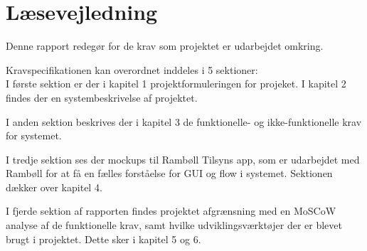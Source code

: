 \chapter*{Læsevejledning}
Denne rapport redegør for de krav som projektet er udarbejdet omkring. 

Kravspecifikationen kan overordnet inddeles i 5 sektioner:\\
I første sektion er der i kapitel 1 projektformuleringen for projeket. I kapitel 2 findes der en systembeskrivelse af projektet.

I anden sektion beskrives der i kapitel 3 de funktionelle- og ikke-funktionelle krav for systemet.

I tredje sektion ses der mockups til Rambøll Tilsyns app, som er udarbejdet med Rambøll for at få en fælles forståelse for GUI og flow i systemet. 
Sektionen dækker over kapitel 4.

I fjerde sektion af rapporten findes projektet afgrænsning med en MoSCoW analyse af de funktionelle krav, samt hvilke udviklingsværktøjer der er blevet brugt i projektet. Dette sker i kapitel 5 og 6.


